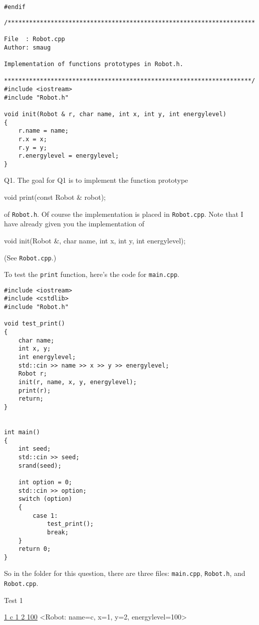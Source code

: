 {\begin{Verbatim}[frame=single]
#endif

\end{Verbatim}
\begin{Verbatim}[frame=single]
/*********************************************************************

File  : Robot.cpp
Author: smaug

Implementation of functions prototypes in Robot.h.

*********************************************************************/
#include <iostream>
#include "Robot.h"

void init(Robot & r, char name, int x, int y, int energylevel)
{
    r.name = name;
    r.x = x;
    r.y = y;
    r.energylevel = energylevel;
}

\end{Verbatim}
}

\newpage
Q1.
The goal for Q1 is to implement the function prototype
{\small
\begin{console}
void print(const Robot & robot);
\end{console}
}
of \verb!Robot.h!.
Of course the implementation is placed in \verb!Robot.cpp!.
Note that I have already given you the implementation of
{\small
\begin{console}
void init(Robot &, char name, int x, int y, int energylevel);
\end{console}
}
(See \verb!Robot.cpp!.)

To test the \verb!print! function, 
here's the code for \verb!main.cpp!.
{\small
\begin{Verbatim}[frame=single]
#include <iostream>
#include <cstdlib>
#include "Robot.h"

void test_print()
{
    char name;
    int x, y;
    int energylevel;
    std::cin >> name >> x >> y >> energylevel;
    Robot r;
    init(r, name, x, y, energylevel);
    print(r);
    return;
}


int main()
{
    int seed;
    std::cin >> seed;
    srand(seed);

    int option = 0;
    std::cin >> option;
    switch (option)
    {
        case 1:
            test_print();
            break;
    }
    return 0;
}      
\end{Verbatim}
}
So in the folder for this question,
there are three files:
\verb!main.cpp!,
\verb!Robot.h!, and \verb!Robot.cpp!.


Test 1
\begin{console}[commandchars=\\\{\}]
\underline{1 c 1 2 100}
<Robot: name=c, x=1, y=2, energylevel=100>
\end{console}

